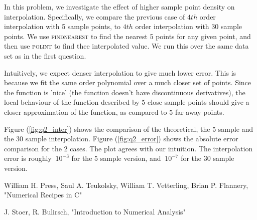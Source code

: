 \documentclass[paper=a4, fontsize=11pt]{scrartcl} %
\numberwithin{equation}{section} %
\numberwithin{figure}{section} %
\numberwithin{table}{section} %
\begin{document}
In this problem, we investigate the effect of higher sample point density on interpolation. Specifically, we compare the previous case of $4th$ order interpolation with 5 sample points, to $4th$ order interpolation with 30 sample points. We use \textsc{findnearest} to find the nearest 5 points for any given point, and then use \textsc{polint} to find thee interpolated value. We run this over the same data set as in the first question. 

Intuitively, we expect denser interpolation to give much lower error. This is because we fit the same order polynomial over a much closer set of points. Since the function is 'nice' (the function doesn't have discontinuous derivatives), the local behaviour of the function described by 5 close sample points should give a closer approximation of the function, as compared to 5 far away points. 

Figure (\ref{fig:q2_inter}) shows the comparison of the theoretical, the 5 sample and the 30 sample interpolation. Figure (\ref{fig:q2_error}) shows the absolute error comparison for the 2 cases. The plot agrees with our intuition. The interpolation error is roughly $~10^{-3}$ for the 5 sample version, and $~10^{-7}$ for the 30 sample version.

\begin{thebibliography}{155}
William H. Press, Saul A. Teukolsky, William T. Vetterling, Brian P. Flannery, "Numerical Recipes in C" 

J. Stoer, R. Bulirsch, "Introduction to Numerical Analysis"

\end{thebibliography}
\end{document}
